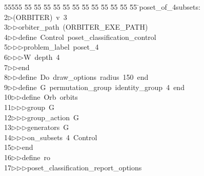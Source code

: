 %
%
\begin{tabbing}
55555 \= 55 \= 55 \= 55 \= 55 \= 55 \= 55 \= 55 \= 55 \= 55 \= 55 \= 55 \= 55 \= \>poset\_of\_4subsets:\\[0pt]
2\>$\triangleright$\>(ORBITER)\ v\ 3\ \\[0pt]
3\>$\triangleright$\>$\triangleright$\>orbiter\_path\ (ORBITER\_EXE\_PATH)\ \\[0pt]
4\>$\triangleright$\>$\triangleright$\>define\ Control\ poset\_classification\_control\ \\[0pt]
5\>$\triangleright$\>$\triangleright$\>$\triangleright$\>problem\_label\ poset\_4\ \\[0pt]
6\>$\triangleright$\>$\triangleright$\>$\triangleright$\>W\ depth\ 4\ \\[0pt]
7\>$\triangleright$\>$\triangleright$\>end\ \\[0pt]
8\>$\triangleright$\>$\triangleright$\>define\ Do\ draw\_options\ radius\ 150\ end\ \\[0pt]
9\>$\triangleright$\>$\triangleright$\>define\ G\ permutation\_group\ identity\_group\ 4\ end\ \\[0pt]
10\>$\triangleright$\>$\triangleright$\>define\ Orb\ orbits\ \\[0pt]
11\>$\triangleright$\>$\triangleright$\>$\triangleright$\>group\ G\ \\[0pt]
12\>$\triangleright$\>$\triangleright$\>$\triangleright$\>group\_action\ G\ \\[0pt]
13\>$\triangleright$\>$\triangleright$\>$\triangleright$\>generators\ G\ \\[0pt]
14\>$\triangleright$\>$\triangleright$\>$\triangleright$\>on\_subsets\ 4\ Control\ \\[0pt]
15\>$\triangleright$\>$\triangleright$\>end\ \\[0pt]
16\>$\triangleright$\>$\triangleright$\>define\ ro\ \\[0pt]
17\>$\triangleright$\>$\triangleright$\>$\triangleright$\>poset\_classification\_report\_options\ \\[0pt]

\end{tabbing}
